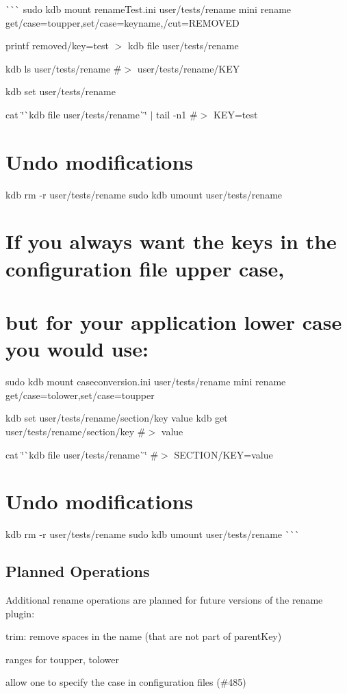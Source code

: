 \`{}\`{}\`{} sudo kdb mount rename\+Test.\+ini user/tests/rename mini rename get/case=toupper,set/case=keyname,/cut=R\+E\+M\+O\+V\+ED

printf \textquotesingle{}removed/key=test\textquotesingle{} $>$ {\ttfamily kdb file user/tests/rename}

kdb ls user/tests/rename \#$>$ user/tests/rename/\+K\+EY

kdb set user/tests/rename

cat \char`\"{}\`{}kdb file user/tests/rename\`{}\char`\"{} $\vert$ tail -\/n1 \#$>$ K\+EY=test\hypertarget{autotoc_md602_autotoc_md613}{}\section{Undo modifications}\label{autotoc_md602_autotoc_md613}
kdb rm -\/r user/tests/rename sudo kdb umount user/tests/rename 
\begin{DoxyCode}{0}
\end{DoxyCode}
 \hypertarget{autotoc_md602_autotoc_md614}{}\section{If you always want the keys in the configuration file upper case,}\label{autotoc_md602_autotoc_md614}
\hypertarget{autotoc_md602_autotoc_md615}{}\section{but for your application lower case you would use\+:}\label{autotoc_md602_autotoc_md615}
sudo kdb mount caseconversion.\+ini user/tests/rename mini rename get/case=tolower,set/case=toupper

kdb set user/tests/rename/section/key value kdb get user/tests/rename/section/key \#$>$ value

cat \char`\"{}\`{}kdb file user/tests/rename\`{}\char`\"{} \#$>$ S\+E\+C\+T\+I\+O\+N/\+K\+EY=value\hypertarget{autotoc_md602_autotoc_md616}{}\section{Undo modifications}\label{autotoc_md602_autotoc_md616}
kdb rm -\/r user/tests/rename sudo kdb umount user/tests/rename \`{}\`{}\`{}\hypertarget{autotoc_md602_autotoc_md617}{}\subsection{Planned Operations}\label{autotoc_md602_autotoc_md617}
Additional rename operations are planned for future versions of the rename plugin\+:


\begin{DoxyItemize}
\item trim\+: remove spaces in the name (that are not part of parent\+Key)
\item ranges for toupper, tolower
\item allow one to specify the case in configuration files (\#485) 
\end{DoxyItemize}
